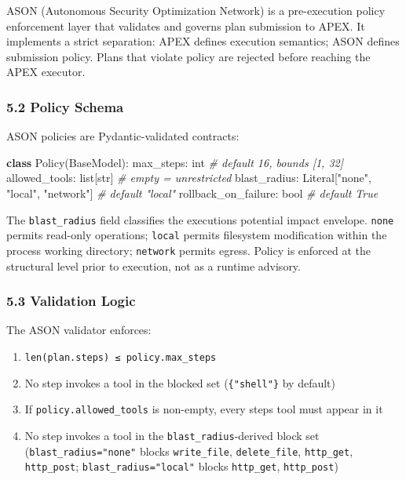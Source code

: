 \documentclass[
]{article}
\newenvironment{Shaded}{}{}
\newcommand{\BuiltInTok}[1]{\textcolor[rgb]{0.00,0.50,0.00}{#1}}
\newcommand{\CommentTok}[1]{\textcolor[rgb]{0.38,0.63,0.69}{\textit{#1}}}
\newcommand{\KeywordTok}[1]{\textcolor[rgb]{0.00,0.44,0.13}{\textbf{#1}}}
\newcommand{\NormalTok}[1]{#1}
\newcommand{\StringTok}[1]{\textcolor[rgb]{0.25,0.44,0.63}{#1}}
\providecommand{\tightlist}{%
  \setlength{\itemsep}{0pt}\setlength{\parskip}{0pt}}
\begin{document}
ASON (Autonomous Security Optimization Network) is a pre-execution
policy enforcement layer that validates and governs plan submission to
APEX. It implements a strict separation: APEX defines execution
semantics; ASON defines submission policy. Plans that violate policy are
rejected before reaching the APEX executor.

\subsubsection{5.2 Policy Schema}\label{52-policy-schema}

ASON policies are Pydantic-validated contracts:

\begin{Shaded}
\begin{Highlighting}[]
\KeywordTok{class}\NormalTok{ Policy(BaseModel):}
\NormalTok{    max\_steps: }\BuiltInTok{int}          \CommentTok{\# default 16, bounds [1, 32]}
\NormalTok{    allowed\_tools: }\BuiltInTok{list}\NormalTok{[}\BuiltInTok{str}\NormalTok{] }\CommentTok{\# empty = unrestricted}
\NormalTok{    blast\_radius: Literal[}\StringTok{"none"}\NormalTok{, }\StringTok{"local"}\NormalTok{, }\StringTok{"network"}\NormalTok{]  }\CommentTok{\# default "local"}
\NormalTok{    rollback\_on\_failure: }\BuiltInTok{bool}  \CommentTok{\# default True}
\end{Highlighting}
\end{Shaded}

The \texttt{blast\_radius} field classifies the
execution\textquotesingle s potential impact envelope. \texttt{none}
permits read-only operations; \texttt{local} permits filesystem
modification within the process working directory; \texttt{network}
permits egress. Policy is enforced at the structural level prior to
execution, not as a runtime advisory.

\subsubsection{5.3 Validation Logic}\label{53-validation-logic}

The ASON validator enforces:

\begin{enumerate}
\def\labelenumi{\arabic{enumi}.}
\tightlist
\item
  \texttt{len(plan.steps)\ ≤\ policy.max\_steps}
\item
  No step invokes a tool in the blocked set (\texttt{\{"shell"\}} by
  default)
\item
  If \texttt{policy.allowed\_tools} is non-empty, every
  step\textquotesingle s tool must appear in it
\item
  No step invokes a tool in the \texttt{blast\_radius}-derived block set
  (\texttt{blast\_radius="none"} blocks \texttt{write\_file},
  \texttt{delete\_file}, \texttt{http\_get}, \texttt{http\_post};
  \texttt{blast\_radius="local"} blocks \texttt{http\_get},
  \texttt{http\_post})
\end{enumerate}
\end{document}
